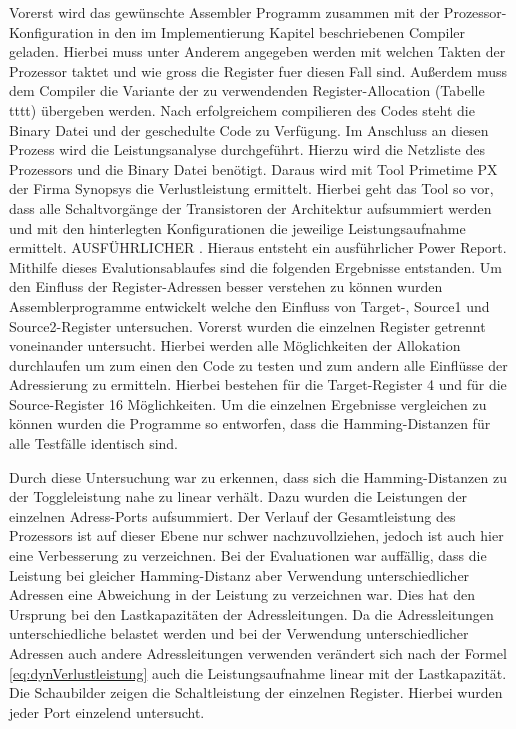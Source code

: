 Vorerst wird das gewünschte Assembler Programm zusammen mit der Prozessor-Konfiguration in den im Implementierung Kapitel beschriebenen Compiler geladen. Hierbei muss unter Anderem angegeben werden mit welchen Takten der Prozessor taktet und wie gross die Register fuer diesen Fall sind. Außerdem muss dem Compiler die Variante der zu verwendenden Register-Allocation (Tabelle tttt) übergeben werden. Nach erfolgreichem compilieren des Codes steht die Binary Datei und der geschedulte Code zu Verfügung. Im Anschluss an diesen Prozess wird die Leistungsanalyse durchgeführt. Hierzu wird die Netzliste des Prozessors und die Binary Datei benötigt. Daraus wird mit Tool Primetime PX der Firma Synopsys die Verlustleistung ermittelt. Hierbei geht das Tool so vor, dass alle Schaltvorgänge der Transistoren der Architektur aufsummiert werden und mit den hinterlegten Konfigurationen die jeweilige Leistungsaufnahme ermittelt. AUSFÜHRLICHER . Hieraus entsteht ein ausführlicher Power Report. 
Mithilfe dieses Evalutionsablaufes sind die folgenden Ergebnisse entstanden.
Um den Einfluss der Register-Adressen besser verstehen zu können wurden Assemblerprogramme entwickelt welche den Einfluss von Target-, Source1 und Source2-Register untersuchen. Vorerst wurden die einzelnen Register getrennt voneinander untersucht. Hierbei werden alle Möglichkeiten der Allokation durchlaufen um zum einen den Code zu testen und zum andern alle Einflüsse der Adressierung zu ermitteln. Hierbei bestehen für die Target-Register 4 und für die Source-Register 16 Möglichkeiten. Um die einzelnen Ergebnisse vergleichen zu können wurden die Programme so entworfen, dass die Hamming-Distanzen für alle Testfälle identisch sind. 

Durch diese Untersuchung war zu erkennen, dass sich die Hamming-Distanzen zu der Toggleleistung nahe zu linear verhält. Dazu wurden die Leistungen der einzelnen Adress-Ports aufsummiert. Der Verlauf der Gesamtleistung des Prozessors ist auf dieser Ebene nur schwer nachzuvollziehen, jedoch ist auch hier eine Verbesserung zu verzeichnen. 
Bei der Evaluationen war auffällig, dass die Leistung bei gleicher Hamming-Distanz aber Verwendung unterschiedlicher Adressen eine Abweichung in der Leistung zu verzeichnen war. Dies hat den Ursprung bei den Lastkapazitäten der Adressleitungen. Da die Adressleitungen unterschiedliche belastet werden und bei der Verwendung unterschiedlicher Adressen auch andere Adressleitungen verwenden verändert sich nach der Formel \ref{eq:dynVerlustleistung} auch die Leistungsaufnahme linear mit der Lastkapazität. 
Die Schaubilder zeigen die Schaltleistung der einzelnen Register. Hierbei wurden jeder Port einzelend untersucht. 

